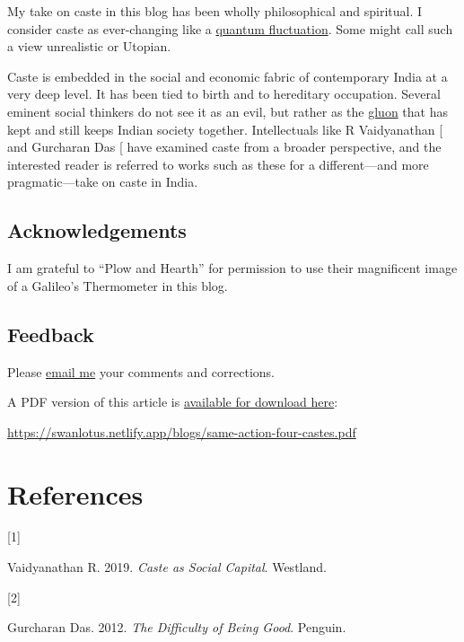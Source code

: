 \documentclass[
  a4paper,
]{article}
\newlength{\cslhangindent}
\newlength{\csllabelwidth}
\newenvironment{CSLReferences}[2] %
 {\begin{list}{}{%
  \setlength{\itemindent}{0pt}
  \setlength{\leftmargin}{0pt}
  \setlength{\parsep}{0pt}
  \ifodd #1
   \setlength{\leftmargin}{\cslhangindent}
   \setlength{\itemindent}{-1\cslhangindent}
  \fi
  \setlength{\itemsep}{#2\baselineskip}}}
 {\end{list}}
\newcommand{\CSLLeftMargin}[1]{\parbox[t]{\csllabelwidth}{\strut#1\strut}}
\newcommand{\CSLRightInline}[1]{\parbox[t]{\linewidth - \csllabelwidth}{\strut#1\strut}}
\begin{document}
My take on caste in this blog has been wholly philosophical and
spiritual. I consider caste as ever-changing like a
\href{https://en.wikipedia.org/wiki/Quantum_fluctuation}{quantum
fluctuation}. Some might call such a view unrealistic or Utopian.

Caste is embedded in the social and economic fabric of contemporary
India at a very deep level. It has been tied to birth and to hereditary
occupation. Several eminent social thinkers do not see it as an evil,
but rather as the \href{https://en.wikipedia.org/wiki/Gluon}{gluon} that
has kept and still keeps Indian society together. Intellectuals like R
Vaidyanathan {[}\citeproc{ref-rv-caste}{1}{]} and Gurcharan Das
{[}\citeproc{ref-das-dharma}{2}{]} have examined caste from a broader
perspective, and the interested reader is referred to works such as
these for a different---and more pragmatic---take on caste in India.

\subsection{Acknowledgements}\label{acknowledgements}

I am grateful to ``Plow and Hearth'' for permission to use their
magnificent image of a Galileo's Thermometer in this blog.

\subsection{Feedback}\label{feedback}

Please \href{mailto:feedback.swanlotus@gmail.com}{email me} your
comments and corrections.

\noindent A PDF version of this article is
\href{./same-action-four-castes.pdf}{available for download here}:

\begin{small}

\begin{sffamily}

\url{https://swanlotus.netlify.app/blogs/same-action-four-castes.pdf}

\end{sffamily}

\end{small}

\section*{References}\label{bibliography}

\label{refs}
\begin{CSLReferences}{0}{0}
\CSLLeftMargin{{[}1{]} }%
\CSLRightInline{Vaidyanathan R. 2019. \emph{{Caste as Social Capital}}.
Westland.}

\CSLLeftMargin{{[}2{]} }%
\CSLRightInline{Gurcharan Das. 2012. \emph{{The Difficulty of Being
Good}}. Penguin.}

\end{CSLReferences}
\end{document}
